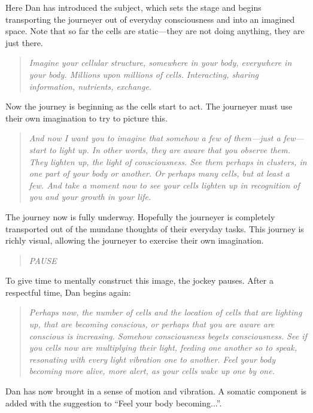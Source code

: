 \documentclass[12pt]{book}
\begin{document}
Here Dan has introduced the subject, which sets the stage and begins transporting the journeyer out of everyday consciousness and into an imagined space. Note that so far the cells are static—they are not doing anything, they are just there.

\begin{quote}{\em
Imagine your cellular structure, somewhere in your body, everywhere in your body. Millions upon millions of cells. Interacting, sharing information, nutrients, exchange.
}\end{quote}
Now the journey is beginning as the cells start to act. The journeyer must use their own imagination to try to picture this.


\begin{quote}{\em
And now I want you to imagine that somehow a few of them—just a few—start to light up. In other words, they are aware that you observe them. They lighten up, the light of consciousness. See them perhaps in clusters, in one part of your body or another. Or perhaps many cells, but at least a few. And take a moment now to see your cells lighten up in recognition of you and your growth in your life.
}\end{quote}

The journey now is fully underway. Hopefully the journeyer is completely transported out of the mundane thoughts of their everyday tasks. This journey is richly visual, allowing the journeyer to exercise their own imagination.

\begin{quote}{\em
  PAUSE
}\end{quote}

To give time to mentally construct this image, the jockey pauses. After a respectful time, Dan begins again:

\begin{quote}{\em
Perhaps now, the number of cells and the location of cells that are lighting up, that are becoming conscious, or perhaps that you are aware are conscious is increasing. Somehow consciousness begets consciousness. See if you cells now are multiplying their light, feeding one another so to speak, resonating with every light vibration one to another. Feel your body becoming more alive, more alert, as your cells wake up one by one.
}\end{quote}


Dan has now brought in a sense of motion and vibration. A somatic
component is added with the suggestion to ``Feel your body becoming...''.
\end{document}

